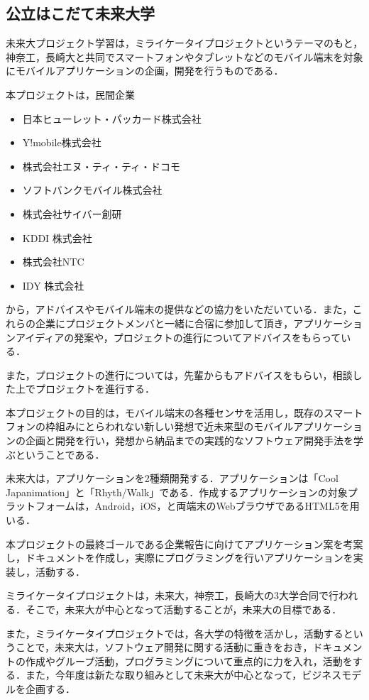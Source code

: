 \subsection{公立はこだて未来大学}
\par
未来大プロジェクト学習は，ミライケータイプロジェクトというテーマのもと，神奈工，長崎大と共同でスマートフォンやタブレットなどのモバイル端末を対象にモバイルアプリケーションの企画，開発を行うものである．
\par
本プロジェクトは，民間企業
\begin{itemize}
\item 日本ヒューレット・パッカード株式会社
\item Y!mobile株式会社
\item 株式会社エヌ・ティ・ティ・ドコモ
\item ソフトバンクモバイル株式会社
\item 株式会社サイバー創研
\item KDDI 株式会社
\item 株式会社NTC
\item IDY 株式会社
\end{itemize}
から，アドバイスやモバイル端末の提供などの協力をいただいている．また，これらの企業にプロジェクトメンバと一緒に合宿に参加して頂き，アプリケーションアイディアの発案や，プロジェクトの進行についてアドバイスをもらっている．
\par
また，プロジェクトの進行については，先輩からもアドバイスをもらい，相談した上でプロジェクトを進行する．
\par
本プロジェクトの目的は，モバイル端末の各種センサを活用し，既存のスマートフォンの枠組みにとらわれない新しい発想で近未来型のモバイルアプリケーションの企画と開発を行い，発想から納品までの実践的なソフトウェア開発手法を学ぶということである．
\par
未来大は，アプリケーションを2種類開発する．アプリケーションは「Cool Japanimation」と「Rhyth/Walk」である．作成するアプリケーションの対象プラットフォームは，Android，iOS，と両端末のWebブラウザであるHTML5を用いる．
\par
本プロジェクトの最終ゴールである企業報告に向けてアプリケーション案を考案し，ドキュメントを作成し，実際にプログラミングを行いアプリケーションを実装し，活動する．
\par
ミライケータイプロジェクトは，未来大，神奈工，長崎大の3大学合同で行われる．そこで，未来大が中心となって活動することが，未来大の目標である．
\par
また，ミライケータイプロジェクトでは，各大学の特徴を活かし，活動するということで，未来大は，ソフトウェア開発に関する活動に重きをおき，ドキュメントの作成やグループ活動，プログラミングについて重点的に力を入れ，活動をする．また，今年度は新たな取り組みとして未来大が中心となって，ビジネスモデルを企画する．
